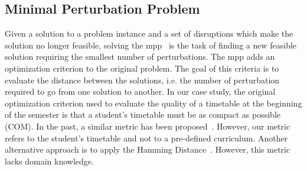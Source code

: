 \documentclass[runningheads]{llncs}
\begin{document}
\subsection{Minimal Perturbation Problem}
Given a solution to a problem instance and a set of disruptions which make the solution no longer feasible, solving the \gls{mpp}~\cite{DBLP:journals/constraints/SakkoutW00} is the task of finding a new feasible solution requiring the smallest number of perturbations. 
The \gls{mpp} adds an optimization criterion to the original problem. The goal of this criteria is to evaluate the distance between the solutions, i.e. the number of perturbation required to go from one solution to another. In our case study, the original optimization criterion used to evaluate the quality of a timetable at the beginning of the semester is that a student's timetable must be as compact as possible (COM). In the past, a similar metric has been proposed~\cite{DBLP:journals/eor/VermuytenLMB16}. However, our metric refers to the student's timetable and not to a pre-defined curriculum. Another alternative approach is to apply the Hamming Distance~\cite{6772729}. However, this metric lacks domain knowledge. 


\end{document}
